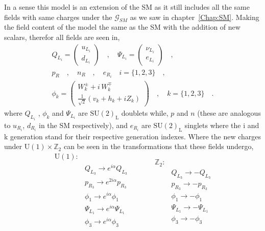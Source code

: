 In a sense this model is an extension of the SM as it still includes all the same fields with same charges under the $\mathcal{G}_{SM}$ as we saw in chapter~\ref{Chap:SM}. 
% 
Making the field content of the model the same as the SM with the addition of new scalars, therefor all fields are seen in,
%
%
\begin{equation}
\label{eq:3HDM_Fields}
\begin{gathered}
Q_{L_i} =  \begin{pmatrix}
u_{L_i}  \\
d_{L_i}
\end{pmatrix} \quad , \quad \Psi_{L_i} =  \begin{pmatrix}
\nu_{L_i}  \\
e_{L_i}
\end{pmatrix} \quad , \quad \\ 
p_R \quad , \quad n_R \quad , \quad e_{R_i} \quad i=\{1,2,3\} \quad ,  \\  
\phi_k = \begin{pmatrix}
W_k^\pm + i \, W_k^\mp \\ 
\frac{1}{\sqrt{2}}\left( v_k + h_k + i Z_k \right) 
\end{pmatrix}  \quad , \quad k=\{ 1,2,3\} \quad . 
\end{gathered} 
\end{equation}
%
where $Q_{L_i}$ , $\phi_k$ and $\Psi_{L_i}$ are $\mathrm{SU(2)_L}$ doublets while, $p$ and $n$ (these are analogous to $u_{R_i}$, $d_{R_i}$ in the SM respectively), and $e_{R_i}$ are $\mathrm{SU(2)_L}$ singlets where the i and k generation stand for their respective generation indexes. 
%
Where the new charges under $\mathrm{U(1)}\times\mathbb{Z}_2$ can be seen in the transformations that these fields undergo, 
%
\begin{equation}
\label{eq:3HDM_Transformations}
	\begin{split} 
	\mathrm{U(1)} : & \\
		& Q_{L_3} \rightarrow    e^{i \alpha} Q_{L_3}  \\  
		& p_{R_3} \rightarrow    e^{2 i \alpha} p_{R_3}  \\
		& \phi_1  \rightarrow    e^{i \alpha} \phi_1  \\   
		& \Psi_{L_1} \rightarrow e^{i \alpha} \Psi_{L_1} \\
		& \phi_3 \rightarrow     e^{i \alpha} \phi_3  \\ 
	\end{split} \quad \quad \quad  
	\begin{split}
		\mathbb{Z}_2 : & \\
		 	& Q_{L_3} \rightarrow -Q_{L_3} \\
		 	& p_{R_3} \rightarrow -p_{R_3} \\ 
		 	& \phi_1  \rightarrow -\phi_1 \\ 
		 	& \Psi_{L_1} \rightarrow - \Psi_{L_1} \\ 
		 	& \phi_3 \rightarrow -\phi_3
	\end{split} 
\end{equation} 
